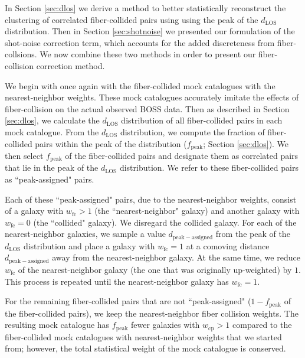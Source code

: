 \documentclass{emulateapj}
\begin{document}
In Section \ref{sec:dlos} we derive a method to better statistically reconstruct the clustering of correlated fiber-collided pairs using using the peak of the $d_\mathrm{LOS}$ distribution. Then in Section \ref{sec:shotnoise} we presented our formulation of the shot-noise correction term, which accounts for the added discreteness from fiber-collsions. We now combine these two methods in order to present our fiber-collision correction method. 

We begin with once again with the fiber-collided mock catalogues with the nearest-neighbor weights. These mock catalogues accurately imitate the effects of fiber-collision on the actual observed BOSS data. Then as described in Section \ref{sec:dlos}, we calculate the $d_\mathrm{LOS}$ distribution of all fiber-collided pairs in each mock catalogue. From the $d_\mathrm{LOS}$ distribution, we compute the fraction of fiber-collided pairs within the peak of the distribution ($f_\mathrm{peak}$; Section \ref{sec:dlos}). We then select $f_\mathrm{peak}$ of the fiber-collided pairs and designate them as correlated pairs that lie in the peak of the $d_\mathrm{LOS}$ distribution. We refer to these fiber-collided pairs as ``peak-assigned" pairs.  

Each of these ``peak-assigned" pairs, due to the nearest-neighbor weights, consist of a galaxy with $w_\mathrm{fc} > 1$ (the ``nearest-neighbor" galaxy) and another galaxy with $w_\mathrm{fc} = 0$ (the ``collided" galaxy). We disregard the collided galaxy. For each of the nearest-neighbor galaxies, we sample a value $d_\mathrm{peak-assigned}$ from the peak of the $d_\mathrm{LOS}$ distribution and place a galaxy with $w_\mathrm{fc} = 1$ at a comoving distance $d_\mathrm{peak-assigned}$ away from the nearest-neighbor galaxy. At the same time, we reduce $w_\mathrm{fc}$ of the nearest-neighbor galaxy (the one that was originally up-weighted) by $1$. This process is repeated until the nearest-neighbor galaxy has $w_\mathrm{fc} =1$. 

For the remaining fiber-collided pairs that are not ``peak-assigned" ($1-f_\mathrm{peak}$ of the fiber-collided pairs), we keep the nearest-neighbor fiber collision weights. The resulting mock catalogue has $f_\mathrm{peak}$ fewer galaxies with $w_\mathrm{cp} > 1$ compared to the fiber-collided mock catalogues with nearest-neighbor weights that we started from; however, the total statistical weight of the mock catalogue is conserved. 
\end{document}
